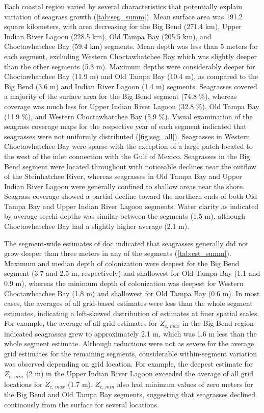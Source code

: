 \documentclass[letterpaper,12pt,oneside]{article}\usepackage[]{graphicx}\usepackage[]{color}
\begin{document}
Each coastal region varied by several characteristics that potentially explain variation of seagrass growth (\cref{tab:seg_summ}).  Mean surface area was 191.2 square kilometers, with area decreasing for the Big Bend (271.4 km), Upper Indian River Lagoon (228.5 km), Old Tampa Bay (205.5 km), and Choctawhatchee Bay (59.4 km) segments.  Mean depth was less than 5 meters for each segment, excluding Western Choctawhatchee Bay which was slightly deeper than the other segments (5.3 m).  Maximum depths were considerably deeper for Choctawhatchee Bay (11.9 m) and Old Tampa Bay (10.4 m), as compared to the Big Bend (3.6 m) and Indian River Lagoon (1.4 m) segments. Seagrasses covered a majority of the surface area for the Big Bend segment (74.8 \%), whereas coverage was much less for Upper Indian River Lagoon (32.8 \%), Old Tampa Bay (11.9 \%), and Western Choctawhatchee Bay (5.9 \%).  Visual examination of the seagrass coverage maps for the respective year of each segment indicated that seagrasses were not uniformly distributed (\cref{fig:seg_all}).  Seagrasses in Western Choctawhatchee Bay were sparse with the exception of a large patch located to the west of the inlet connection with the Gulf of Mexico.  Seagrasses in the Big Bend segment were located throughout with noticeable declines near the outflow of the Steinhatchee River, whereas seagrasses in Old Tampa Bay and Upper Indian River Lagoon were generally confined to shallow areas near the shore. Seagrass coverage showed a partial decline toward the northern ends of both Old Tampa Bay and Upper Indian River Lagoon segments.  Water clarity as indicated by average secchi depths was similar between the segments (1.5 m), although Choctawhatchee Bay had a slightly higher average (2.1 m).     



The segment-wide estimates of \ac{doc} indicated that seagrasses generally did not grow deeper than three meters in any of the segments (\cref{tab:est_summ}).  Maximum and median depth of colonization were deepest for the Big Bend segment (3.7 and 2.5 m, respectively) and shallowest for Old Tampa Bay (1.1 and 0.9 m), whereas the minimum depth of colonization was deepest for Western Choctawhatchee Bay (1.8 m) and shallowest for Old Tampa Bay (0.6 m).  In most cases, the averages of all grid-based estimates were less than the whole segment estimates, indicating a left-skewed distribution of estimates at finer spatial scales.  For example, the average of all grid estimates for $Z_{c,\,max}$ in the Big Bend region indicated seagrasses grew to approximately 2.1 m, which was 1.6 m less than the whole segment estimate.  Although reductions were not as severe for the average grid estimates for the remaining segments, considerable within-segment variation was observed depending on grid location.  For example, the deepest estimate for $Z_{c,\,min}$ (2 m) in the Upper Indian River Lagoon exceeded the average of all grid locations for $Z_{c,\,max}$ (1.7 m).  $Z_{c,\,min}$ also had minimum values of zero meters for the Big Bend and Old Tampa Bay segments, suggesting that seagrasses declined continously from the surface for several locations.   
\end{document}
